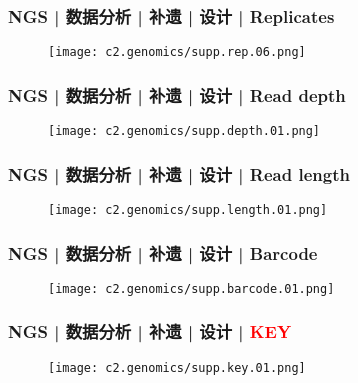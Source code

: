 \begin{frame}
  \frametitle{NGS | 数据分析 | 补遗 | 设计 | Replicates}
  \begin{figure}
    \centering
    \texttt{[image: c2.genomics/supp.rep.06.png]}
  \end{figure}
\end{frame}

\begin{frame}
  \frametitle{NGS | 数据分析 | 补遗 | 设计 | Read depth}
  \begin{figure}
    \centering
    \texttt{[image: c2.genomics/supp.depth.01.png]}
  \end{figure}
\end{frame}

\begin{frame}
  \frametitle{NGS | 数据分析 | 补遗 | 设计 | Read length}
  \begin{figure}
    \centering
    \texttt{[image: c2.genomics/supp.length.01.png]}
  \end{figure}
\end{frame}

\begin{frame}
  \frametitle{NGS | 数据分析 | 补遗 | 设计 | Barcode}
  \begin{figure}
    \centering
    \texttt{[image: c2.genomics/supp.barcode.01.png]}
  \end{figure}
\end{frame}

\begin{frame}
  \frametitle{NGS | 数据分析 | 补遗 | 设计 | \textcolor{red}{KEY}}
  \begin{figure}
    \centering
    \texttt{[image: c2.genomics/supp.key.01.png]}
  \end{figure}
\end{frame}

